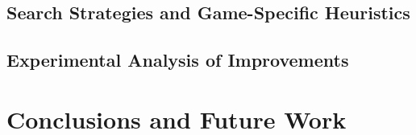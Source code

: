 \documentclass[a4paper,fleqn]{cas-sc}
\begin{document}

\subsection{Search Strategies and Game-Specific Heuristics}\label{sec:search_heuristics}


\subsection{Experimental Analysis of Improvements}\label{sec:improve_experiments}


\section{Conclusions and Future Work}\label{sec:conclusion}

\printcredits

\newpage

%





\end{document}
